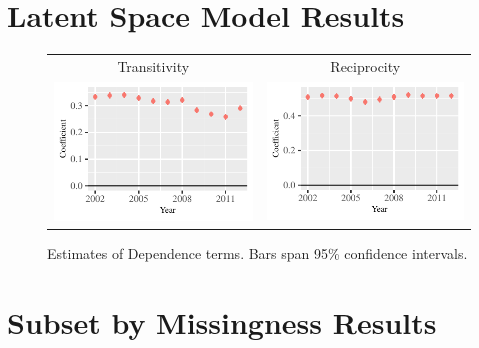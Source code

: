 \documentclass[reqno,onecolumn,letterpaper,12pt]{article}
\begin{document}
\section{Latent Space Model Results}\label{LSMresults}


\begin{figure}[!h]
\centering
\begin{tabular}{@{\hskip -.05cm}c@{\hskip .2cm}c}
Transitivity  & Reciprocity\\
\includegraphics[height=.165\textheight, clip=true, trim=.5cm .5cm 0cm .1cm]{SI_figures/LSM_rl_plots/trans_dep.pdf}   &
\includegraphics[height=.165\textheight, clip=true, trim=.5cm .5cm 0cm .1cm]{SI_figures/LSM_rl_plots/dyad_dep.pdf} \\
\end{tabular}
\caption{\label{fig:LSMnetterms} Estimates of Dependence terms. Bars span 95\% confidence intervals. }
\end{figure}

\section{Subset by Missingness Results}\label{qlevelresults}
\end{document}

